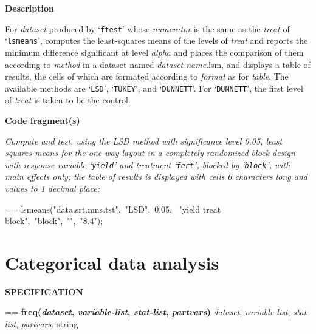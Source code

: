 \documentclass{book}
\makeatletter
\newcommand\Texinfocommandstyletextvar[1]{{\normalfont{}\textsl{#1}}}%
\newenvironment{Texinfopreformatted}{%
  \par\GNUTobeylines\obeyspaces\frenchspacing\parskip=\z@\parindent=\z@}{}
{\catcode`\^^M=13 \gdef\GNUTobeylines{\catcode`\^^M=13 \def^^M{\null\par}}}
\newenvironment{Texinfoindented}{\begin{list}{}{}\item\relax}{\end{list}}
\renewcommand{\_}{\Texinfounderscore\discretionary{}{}{}}
\makeatother
\begin{document}
\noindent{}\textbf{Description}

For \Texinfocommandstyletextvar{dataset} produced by `\texttt{ftest}' whose \Texinfocommandstyletextvar{numerator} is the same
as the \Texinfocommandstyletextvar{treat} of `\texttt{lsmeans}',
computes the least-squares means of the levels of
\Texinfocommandstyletextvar{treat} and reports the minimum difference significant at level
\Texinfocommandstyletextvar{alpha} and places the comparison of them according to
\Texinfocommandstyletextvar{method} in a dataset named
\Texinfocommandstyletextvar{dataset-name}.lsm,
and displays a table of results, the cells of which are
formated according to \Texinfocommandstyletextvar{format} as for \Texinfocommandstyletextvar{table}.
The available methods are
%
%
%
%
`\texttt{LSD}', `\texttt{TUKEY}', and `\texttt{DUNNETT}'.
For `\texttt{DUNNETT}', the first level of \Texinfocommandstyletextvar{treat} is taken to be the control.
%

\noindent{}\textbf{Code fragment(s)}

\emph{Compute and test, using the LSD method with significance level
0.05, least squares means
for the one-way layout in a completely randomized block design with
response variable `\texttt{yield}' and treatment `\texttt{fert}',
blocked by `\texttt{block}', with main effects only; the table of
results is displayed with cells 6 characters long and values
to 1 decimal place:}
\begin{Texinfoindented}
\begin{Texinfopreformatted}%
\ttfamily lsmeans("data.srt.mns.tst",\ "LSD",\ 0.05,
\                    "yield treat block",\ "block",\ "",\ "8.4");
\end{Texinfopreformatted}
\end{Texinfoindented}

\section{{Categorical data analysis}}
\label{anchor:Categorical-data-analysis}%

\noindent{}\textbf{SPECIFICATION}
\begin{Texinfoindented}
\begin{Texinfopreformatted}%
\textbf{freq(\Texinfocommandstyletextvar{dataset}, \Texinfocommandstyletextvar{variable-list}, \Texinfocommandstyletextvar{stat-list}, \Texinfocommandstyletextvar{partvars})}
\Texinfocommandstyletextvar{dataset}, \Texinfocommandstyletextvar{variable-list}, \Texinfocommandstyletextvar{stat-list}, \Texinfocommandstyletextvar{partvars:} string
\end{Texinfopreformatted}
\end{Texinfoindented}
\end{document}
